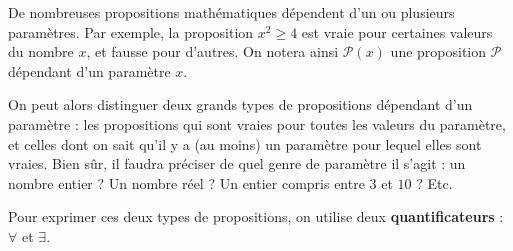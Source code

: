 \documentclass[11pt,class=report,crop=false]{standalone}
\begin{document}
De nombreuses propositions mathématiques dépendent d'un ou plusieurs paramètres. Par exemple, la proposition $x^2 \geq 4$ est vraie pour certaines valeurs du nombre $x$, et fausse pour d'autres. On notera ainsi $\mathcal{P}(x)$ une proposition $\mathcal{P}$ dépendant d'un paramètre $x$. 


On peut alors distinguer deux grands types de propositions dépendant d'un paramètre : les propositions qui sont vraies pour toutes les valeurs du paramètre, et celles dont on sait qu'il y a (au moins) un paramètre pour lequel elles sont vraies. Bien sûr, il faudra préciser de quel genre de paramètre il s'agit : un nombre entier ? Un nombre réel ? Un entier compris entre $3$ et $10$ ? Etc.


Pour exprimer ces deux types de propositions, on utilise deux \textbf{quantificateurs} : $\forall$ et $\exists$.
\end{document}
